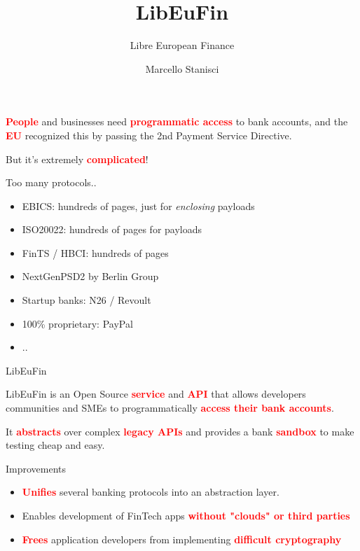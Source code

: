 \documentclass[pdf, aspectratio=169]{beamer}
\title{LibEuFin}
\subtitle{Libre European Finance}
\author{Marcello Stanisci}
\newcommand{\boldred}[1]{\textcolor{red}{\textbf{#1}}}
\begin{document}
\begin{frame}
  \titlepage
\end{frame}

\begin{frame}
  \begin{center}
  \boldred{People} and businesses need \boldred{programmatic access} to bank accounts, and
  the \boldred{EU} recognized this by passing the 2nd Payment Service Directive.

  But it's extremely \boldred{complicated}!
  \end{center}
\end{frame}

\begin{frame}{Too many protocols..}
  \begin{itemize}
    \item EBICS: hundreds of pages, just for {\it enclosing} payloads
    \item ISO20022: hundreds of pages for payloads
    \item FinTS / HBCI: hundreds of pages
    \item NextGenPSD2 by Berlin Group 
    \item Startup banks: N26 / Revoult
    \item 100\% proprietary: PayPal
    \item ..
  \end{itemize}
\end{frame}

\begin{frame}{LibEuFin}
  \begin{center}
  LibEuFin is an Open Source \boldred{service} and \boldred{API} that allows
  developers communities and SMEs to programmatically \boldred{access their bank accounts}.

  It \boldred{abstracts} over complex \boldred{legacy APIs} and provides a bank \boldred{sandbox}
  to make testing cheap and easy.
  \end{center}
\end{frame}

\begin{frame}{Improvements}
  \begin{itemize}
  \item \boldred{Unifies} several banking protocols into an abstraction layer.
  \item Enables development of FinTech apps \boldred{without "clouds" or third parties}
  \item \boldred{Frees} application developers from implementing \boldred{difficult cryptography}
  \end{itemize}
\end{frame}
\end{document}
